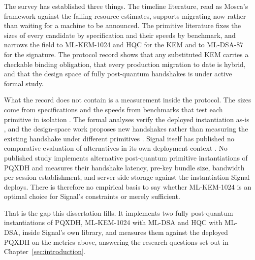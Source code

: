 The survey has established three things. The timeline literature, read as Mosca's framework against the falling resource estimates, supports migrating now rather than waiting for a machine to be announced. The primitive literature fixes the sizes of every candidate by specification and their speeds by benchmark, and narrows the field to ML-KEM-1024 and HQC for the KEM and to ML-DSA-87 for the signature. The protocol record shows that any substituted KEM carries a checkable binding obligation, that every production migration to date is hybrid, and that the design space of fully post-quantum handshakes is under active formal study.

What the record does not contain is a measurement inside the protocol. The sizes come from specifications and the speeds from benchmarks that test each primitive in isolation \cite{open_quantum_safe_project_benchmarking_nodate, bernstein_ebacs_nodate}. The formal analyses verify the deployed instantiation as-is \cite{bhargavan_formal_2024}, and the design-space work proposes new handshakes rather than measuring the existing handshake under different primitives \cite{hashimoto_bundled_2025}. Signal itself has published no comparative evaluation of alternatives in its own deployment context \cite{kret_quantum_nodate}. No published study implements alternative post-quantum primitive instantiations of PQXDH and measures their handshake latency, pre-key bundle size, bandwidth per session establishment, and server-side storage against the instantiation Signal deploys. There is therefore no empirical basis to say whether ML-KEM-1024 is an optimal choice for Signal's constraints or merely sufficient.

That is the gap this dissertation fills. It implements two fully post-quantum instantiations of PQXDH, ML-KEM-1024 with ML-DSA and HQC with ML-DSA, inside Signal's own library, and measures them against the deployed PQXDH on the metrics above, answering the research questions set out in Chapter~\ref{sec:introduction}.